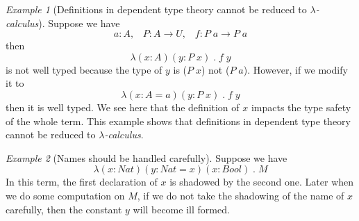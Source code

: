 \documentclass{article}
\theoremstyle{remark}
\newtheorem{example}{Example}[section]
\begin{document}
\begin{example}[Definitions in dependent type theory cannot be reduced to \emph{$\lambda$-calculus}] \label{exa1}
  Suppose we have
  \[ a : A, \;\;\; P : A \to U, \;\;\; f : P \; a \to P \; a \]
  then
  \[ \lambda (x : A) (y : P \; x) \; . \; f \; y \]
  is not well typed because the type of $y$ is ($P \; x$) not ($P \; a$). However, if we modify it to
  \[ \lambda (x : A = a) (y : P \; x) \; . \; f \; y \]
  then it is well typed. We see here that the definition of $x$ impacts the type safety of the whole term. This example shows that definitions in dependent type theory cannot be reduced to \emph{$\lambda$-calculus}.
\end{example}

\begin{example}[Names should be handled carefully] \label{exa2}
  Suppose we have
  \[ \lambda (x : Nat) (y : Nat = x) (x : Bool) \; . \; M \]
  In this term, the first declaration of $x$ is shadowed by the second one. Later when we do some computation on $M$, if we do not take the shadowing of the name of $x$ carefully, then the constant $y$ will become ill formed.
\end{example}
\end{document}
